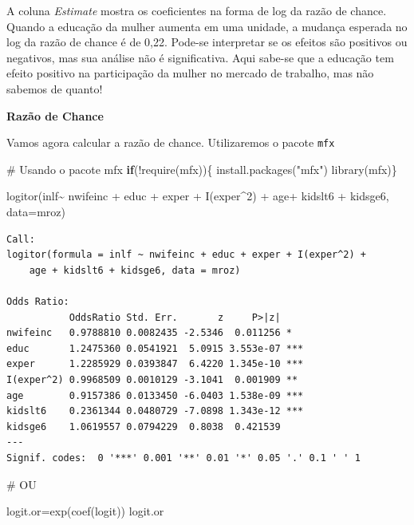 \documentclass[
  letterpaper,
  DIV=11,
  numbers=noendperiod]{scrreprt}
\newenvironment{Shaded}{\begin{snugshade}}{\end{snugshade}}
\newcommand{\AttributeTok}[1]{\textcolor[rgb]{0.40,0.45,0.13}{#1}}
\newcommand{\CommentTok}[1]{\textcolor[rgb]{0.37,0.37,0.37}{#1}}
\newcommand{\ControlFlowTok}[1]{\textcolor[rgb]{0.00,0.23,0.31}{\textbf{#1}}}
\newcommand{\DecValTok}[1]{\textcolor[rgb]{0.68,0.00,0.00}{#1}}
\newcommand{\FunctionTok}[1]{\textcolor[rgb]{0.28,0.35,0.67}{#1}}
\newcommand{\NormalTok}[1]{\textcolor[rgb]{0.00,0.23,0.31}{#1}}
\newcommand{\OtherTok}[1]{\textcolor[rgb]{0.00,0.23,0.31}{#1}}
\newcommand{\SpecialCharTok}[1]{\textcolor[rgb]{0.37,0.37,0.37}{#1}}
\newcommand{\StringTok}[1]{\textcolor[rgb]{0.13,0.47,0.30}{#1}}
\begin{document}
A coluna \emph{Estimate} mostra os coeficientes na forma de log da razão
de chance. Quando a educação da mulher aumenta em uma unidade, a mudança
esperada no log da razão de chance é de 0,22. Pode-se interpretar se os
efeitos são positivos ou negativos, mas sua análise não é significativa.
Aqui sabe-se que a educação tem efeito positivo na participação da
mulher no mercado de trabalho, mas não sabemos de quanto!

\textbf{Razão de Chance}

Vamos agora calcular a razão de chance. Utilizaremos o pacote
\texttt{mfx}

\begin{Shaded}
\begin{Highlighting}[]
\CommentTok{\# Usando o pacote mfx}
\ControlFlowTok{if}\NormalTok{(}\SpecialCharTok{!}\FunctionTok{require}\NormalTok{(mfx))\{}
    \FunctionTok{install.packages}\NormalTok{(}\StringTok{"mfx"}\NormalTok{)}
    \FunctionTok{library}\NormalTok{(mfx)\}}


\FunctionTok{logitor}\NormalTok{(inlf}\SpecialCharTok{\textasciitilde{}}\NormalTok{ nwifeinc }\SpecialCharTok{+}\NormalTok{ educ }\SpecialCharTok{+}\NormalTok{ exper }\SpecialCharTok{+} \FunctionTok{I}\NormalTok{(exper}\SpecialCharTok{\^{}}\DecValTok{2}\NormalTok{) }\SpecialCharTok{+} 
\NormalTok{                  age}\SpecialCharTok{+}\NormalTok{ kidslt6 }\SpecialCharTok{+}\NormalTok{ kidsge6, }\AttributeTok{data=}\NormalTok{mroz)}
\end{Highlighting}
\end{Shaded}

\begin{verbatim}
Call:
logitor(formula = inlf ~ nwifeinc + educ + exper + I(exper^2) + 
    age + kidslt6 + kidsge6, data = mroz)

Odds Ratio:
           OddsRatio Std. Err.       z     P>|z|    
nwifeinc   0.9788810 0.0082435 -2.5346  0.011256 *  
educ       1.2475360 0.0541921  5.0915 3.553e-07 ***
exper      1.2285929 0.0393847  6.4220 1.345e-10 ***
I(exper^2) 0.9968509 0.0010129 -3.1041  0.001909 ** 
age        0.9157386 0.0133450 -6.0403 1.538e-09 ***
kidslt6    0.2361344 0.0480729 -7.0898 1.343e-12 ***
kidsge6    1.0619557 0.0794229  0.8038  0.421539    
---
Signif. codes:  0 '***' 0.001 '**' 0.01 '*' 0.05 '.' 0.1 ' ' 1
\end{verbatim}

\begin{Shaded}
\begin{Highlighting}[]
\CommentTok{\# OU}

\NormalTok{logit.or}\OtherTok{=}\FunctionTok{exp}\NormalTok{(}\FunctionTok{coef}\NormalTok{(logit))}
\NormalTok{logit.or}
\end{Highlighting}
\end{Shaded}
\end{document}
